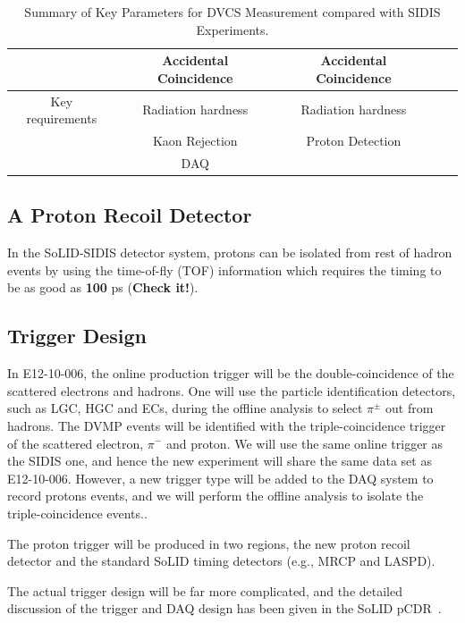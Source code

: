 \begin{table}
\begin{tabular}{|c|c|c|c|c|}
                                                &   Accidental Coincidence      & Accidental Coincidence	\\\hline
Key requirements                      &  Radiation hardness   & Radiation hardness	\\
                                             &  Kaon Rejection   & Proton Detection	\\
                                              &  DAQ                  &       \\
                        \hline
\end{tabular}
\caption{\footnotesize{Summary of Key Parameters for DVCS Measurement compared with SIDIS Experiments.}}\label{table:program_summary}
\label{table:key_par_sidis_dvcs}
\end{table} 

\subsection{A Proton Recoil Detector}
In the SoLID-SIDIS detector system, protons can be isolated from rest of hadron events by using the time-of-fly (TOF) information which requires the timing to be as good as {\bf 100} ps ({\bf Check it!}). 



\subsection{Trigger Design}
In E12-10-006, the online production trigger will be the double-coincidence of the scattered electrons and hadrons. One will use the particle identification detectors, such as LGC, HGC and ECs, during the offline analysis to select $\pi^{\pm}$ out from hadrons. The DVMP events will be identified with the triple-coincidence trigger of the scattered electron, $\pi^{-}$ and proton. We will use the same online trigger as the SIDIS one, and hence the new experiment will share the same data set as E12-10-006. However, a new trigger type will be added to the DAQ system to record protons events, and we will perform the offline analysis to isolate the triple-coincidence events.. 

The proton trigger will be produced in two regions, the new proton recoil detector and the standard SoLID timing detectors (e.g., MRCP and LASPD). 

The actual trigger design will be far more complicated, and the detailed discussion of the trigger and DAQ design has been given in the SoLID pCDR~\cite{solid_pcdr}.
